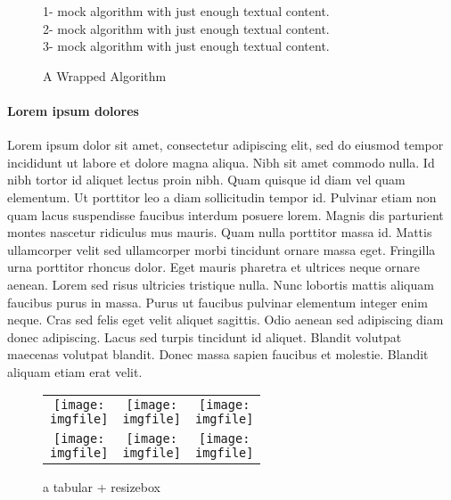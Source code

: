 \documentclass{article}
\def\imgfile{../graphics/none.png}
\begin{document}
\begin{wrapfigure}{r}{0.35\textwidth}
  \vspace{-2.25em}
  \centering
  \begin{minipage}{\linewidth}
  \begin{algorithm}[H]
  \caption{A Wrapped Algorithm}
  1- mock algorithm with just enough textual content.\\
  2- mock algorithm with just enough textual content.\\
  3- mock algorithm with just enough textual content.
  \end{algorithm}
  \end{minipage}
  \vspace{-1em}
\end{wrapfigure}
\vspace{-2mm}
\paragraph{Lorem ipsum dolores} Lorem ipsum dolor sit amet, consectetur adipiscing elit, sed do eiusmod tempor incididunt ut labore et dolore magna aliqua. Nibh sit amet commodo nulla. Id nibh tortor id aliquet lectus proin nibh. Quam quisque id diam vel quam elementum. Ut porttitor leo a diam sollicitudin tempor id. Pulvinar etiam non quam lacus suspendisse faucibus interdum posuere lorem. Magnis dis parturient montes nascetur ridiculus mus mauris. Quam nulla porttitor massa id. Mattis ullamcorper velit sed ullamcorper morbi tincidunt ornare massa eget. Fringilla urna porttitor rhoncus dolor. Eget mauris pharetra et ultrices neque ornare aenean. Lorem sed risus ultricies tristique nulla. Nunc lobortis mattis aliquam faucibus purus in massa. Purus ut faucibus pulvinar elementum integer enim neque. Cras sed felis eget velit aliquet sagittis. Odio aenean sed adipiscing diam donec adipiscing. Lacus sed turpis tincidunt id aliquet. Blandit volutpat maecenas volutpat blandit. Donec massa sapien faucibus et molestie. Blandit aliquam etiam erat velit.
\clearpage

\begin{figure*}[htbp]
	\centering
  \begin{tabular}{ccc}
 		\resizebox{5.0cm}{!}{\texttt{[image: \\imgfile]}}&
		\resizebox{5.0cm}{!}{\texttt{[image: \\imgfile]}}&
		\resizebox{5.0cm}{!}{\texttt{[image: \\imgfile]}}\\
		\resizebox{5.0cm}{!}{\texttt{[image: \\imgfile]}}&
		\resizebox{5.0cm}{!}{\texttt{[image: \\imgfile]}}&
		\resizebox{5.0cm}{!}{\texttt{[image: \\imgfile]}}
   \end{tabular}
	\caption{a tabular + resizebox}
\end{figure*}
\clearpage
\end{document}
